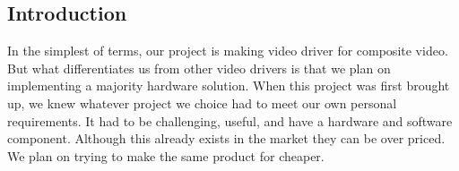 \subsection{Introduction}

In the simplest of terms, our project is making video driver for composite
video. But what differentiates us from other video drivers is that we plan on 
implementing a majority hardware solution. When this project was first 
brought up, we knew whatever project we choice had to meet our own personal
requirements. It had to be challenging, useful, and have a hardware and 
software component. Although this already exists in the market they can be over
priced. We plan on trying to make the same product for cheaper.  
